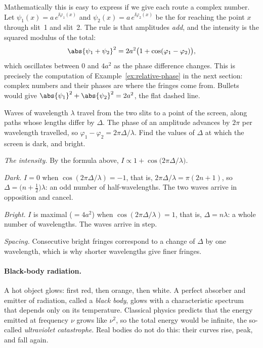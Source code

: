 Mathematically this is easy to express if we give each route a complex number. Let $\psi_1(x)=a\,e^{\ii\varphi_1(x)}$ and $\psi_2(x)=a\,e^{\ii\varphi_2(x)}$ be the  for reaching the point $x$ through slit~1 and slit~2. The rule is that amplitudes \emph{add}, and the intensity is the squared modulus of the total:
\[
  \abs{\psi_1+\psi_2}^2=2a^2\bigl(1+\cos(\varphi_1-\varphi_2)\bigr),
\]
which oscillates between $0$ and $4a^2$ as the phase difference changes. This is precisely the computation of Example~\ref{ex:relative-phase} in the next section: complex numbers and their phases are where the fringes come from. Bullets would give $\abs{\psi_1}^2+\abs{\psi_2}^2=2a^2$, the flat dashed line.

\begin{example}\label{ex:dark-fringes}
  Waves of wavelength $\lambda$ travel from the two slits to a point of the screen, along paths whose lengths differ by $\Delta$. The phase of an amplitude advances by $2\pi$ per wavelength travelled, so $\varphi_1-\varphi_2=2\pi\Delta/\lambda$. Find the values of $\Delta$ at which the screen is dark, and bright.
\end{example}
\begin{solution}
  \begin{steps}
    \item \emph{The intensity.} By the formula above, $I\propto1+\cos\bigl(2\pi\Delta/\lambda\bigr)$.
    \item \emph{Dark.} $I=0$ when $\cos(2\pi\Delta/\lambda)=-1$, that is, $2\pi\Delta/\lambda=\pi(2n+1)$, so $\Delta=\bigl(n+\tfrac12\bigr)\lambda$: an odd number of half-wavelengths. The two waves arrive in opposition and cancel.
    \item \emph{Bright.} $I$ is maximal ($=4a^2$) when $\cos(2\pi\Delta/\lambda)=1$, that is, $\Delta=n\lambda$: a whole number of wavelengths. The waves arrive in step.
    \item \emph{Spacing.} Consecutive bright fringes correspond to a change of $\Delta$ by one wavelength, which is why shorter wavelengths give finer fringes.
  \end{steps}
\end{solution}

\paragraph{Black-body radiation.}
A hot object glows: first red, then orange, then white. A perfect absorber and emitter of radiation, called a \emph{black body}, glows with a characteristic spectrum that depends only on its temperature. Classical physics predicts that the energy emitted at frequency $\nu$ grows like $\nu^2$, so the total energy would be infinite, the so-called \emph{ultraviolet catastrophe}.
Real bodies do not do this: their curves rise, peak, and fall again.

